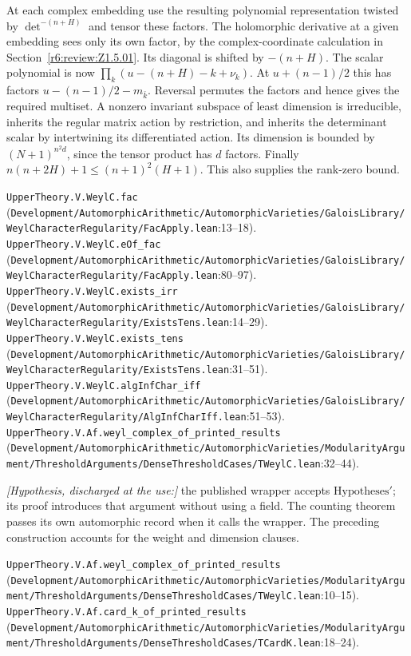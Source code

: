 At each complex embedding use the resulting polynomial representation twisted by $\det^{-(n+H)}$ and tensor these factors. The holomorphic derivative at a given embedding sees only its own factor, by the complex-coordinate calculation in Section~\ref{r6:review:Z1.5.01}. Its diagonal is shifted by $-(n+H)$. The scalar polynomial is now $\prod_k(u-(n+H)-k+\nu_k)$. At $u+(n-1)/2$ this has factors $u-(n-1)/2-m_{\bar k}$. Reversal permutes the factors and hence gives the required multiset. A nonzero invariant subspace of least dimension is irreducible, inherits the regular matrix action by restriction, and inherits the determinant scalar by intertwining its differentiated action. Its dimension is bounded by $(N+1)^{n^2d}$, since the tensor product has $d$ factors. Finally $n(n+2H)+1\le(n+1)^2(H+1)$. This also supplies the rank-zero bound.
\par{\footnotesize \nolinkurl{UpperTheory.V.WeylC.fac} (\nolinkurl{Development/AutomorphicArithmetic/AutomorphicVarieties/GaloisLibrary/WeylCharacterRegularity/FacApply.lean}\allowbreak:13--18). \nolinkurl{UpperTheory.V.WeylC.eOf_fac} (\nolinkurl{Development/AutomorphicArithmetic/AutomorphicVarieties/GaloisLibrary/WeylCharacterRegularity/FacApply.lean}\allowbreak:80--97). \nolinkurl{UpperTheory.V.WeylC.exists_irr} (\nolinkurl{Development/AutomorphicArithmetic/AutomorphicVarieties/GaloisLibrary/WeylCharacterRegularity/ExistsTens.lean}\allowbreak:14--29). \nolinkurl{UpperTheory.V.WeylC.exists_tens} (\nolinkurl{Development/AutomorphicArithmetic/AutomorphicVarieties/GaloisLibrary/WeylCharacterRegularity/ExistsTens.lean}\allowbreak:31--51). \nolinkurl{UpperTheory.V.WeylC.algInfChar_iff} (\nolinkurl{Development/AutomorphicArithmetic/AutomorphicVarieties/GaloisLibrary/WeylCharacterRegularity/AlgInfCharIff.lean}\allowbreak:51--53). \nolinkurl{UpperTheory.V.Af.weyl_complex_of_printed_results} (\nolinkurl{Development/AutomorphicArithmetic/AutomorphicVarieties/ModularityArgument/ThresholdArguments/DenseThresholdCases/TWeylC.lean}\allowbreak:32--44).\par}

\textit{[Hypothesis, discharged at the use:]} the published wrapper accepts $\mathrm{Hypotheses}'$; its proof introduces that argument without using a field. The counting theorem passes its own automorphic record when it calls the wrapper. The preceding construction accounts for the weight and dimension clauses.
\par{\footnotesize \nolinkurl{UpperTheory.V.Af.weyl_complex_of_printed_results} (\nolinkurl{Development/AutomorphicArithmetic/AutomorphicVarieties/ModularityArgument/ThresholdArguments/DenseThresholdCases/TWeylC.lean}\allowbreak:10--15). \nolinkurl{UpperTheory.V.Af.card_k_of_printed_results} (\nolinkurl{Development/AutomorphicArithmetic/AutomorphicVarieties/ModularityArgument/ThresholdArguments/DenseThresholdCases/TCardK.lean}\allowbreak:18--24).\par}

